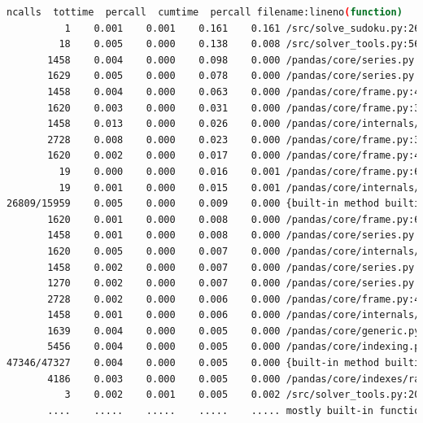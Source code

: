 \documentclass[12pt]{report} %
\begin{document}
\begin{lstlisting}[language=Bash, caption={Profiling output for easy sudoku},basicstyle=\tiny]
          ncalls  tottime  percall  cumtime  percall filename:lineno(function)
          1    0.001    0.001    0.161    0.161 /src/solve_sudoku.py:26(solve_sudoku)
         18    0.005    0.000    0.138    0.008 /src/solver_tools.py:56(markup)
       1458    0.004    0.000    0.098    0.000 /pandas/core/series.py:1180(__setitem__)
       1629    0.005    0.000    0.078    0.000 /pandas/core/series.py:1396(_maybe_update_cacher)
       1458    0.004    0.000    0.063    0.000 /pandas/core/frame.py:4430(_maybe_cache_changed)
       1620    0.003    0.000    0.031    0.000 /pandas/core/frame.py:3779(_ixs)
       1458    0.013    0.000    0.026    0.000 /pandas/core/internals/managers.py:1045(iset)
       2728    0.008    0.000    0.023    0.000 /pandas/core/frame.py:3856(__getitem__)
       1620    0.002    0.000    0.017    0.000 /pandas/core/frame.py:4387(_box_col_values)
         19    0.000    0.000    0.016    0.001 /pandas/core/frame.py:668(__init__)
         19    0.001    0.000    0.015    0.001 /pandas/core/internals/construction.py:423(dict_to_mgr)
26809/15959    0.005    0.000    0.009    0.000 {built-in method builtins.len}
       1620    0.001    0.000    0.008    0.000 /pandas/core/frame.py:656(_constructor_sliced_from_mgr)
       1458    0.001    0.000    0.008    0.000 /pandas/core/series.py:1270(_set_with_engine)
       1620    0.005    0.000    0.007    0.000 /pandas/core/internals/managers.py:991(iget)
       1458    0.002    0.000    0.007    0.000 /pandas/core/series.py:1385(_check_is_chained_assignment_possible)
       1270    0.002    0.000    0.007    0.000 /pandas/core/series.py:1016(__getitem__)
       2728    0.002    0.000    0.006    0.000 /pandas/core/frame.py:4405(_get_item_cache)  
       1458    0.001    0.000    0.006    0.000 /pandas/core/internals/managers.py:1977(setitem_inplace)
       1639    0.004    0.000    0.005    0.000 /pandas/core/generic.py:6147(__finalize__)
       5456    0.004    0.000    0.005    0.000 /pandas/core/indexing.py:2678(check_dict_or_set_indexers)
47346/47327    0.004    0.000    0.005    0.000 {built-in method builtins.isinstance}
       4186    0.003    0.000    0.005    0.000 /pandas/core/indexes/range.py:394(__contains__)
          3    0.002    0.001    0.005    0.002 /src/solver_tools.py:20(check_sudoku)
       ....    .....    .....    .....    ..... mostly built-in functions of packages
\end{lstlisting}
\end{document}
